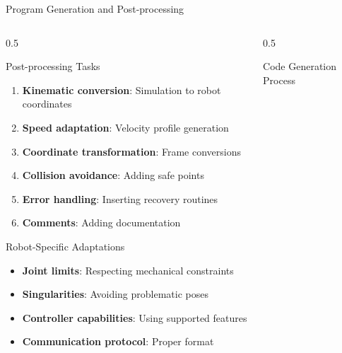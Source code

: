 \documentclass[10pt,aspectratio=169]{beamer}
\begin{document}
\begin{frame}{Program Generation and Post-processing}
\begin{columns}[T]
\begin{column}{0.5\textwidth}
\begin{block}{Post-processing Tasks}
\begin{enumerate}
\item \textbf{Kinematic conversion}: Simulation to robot coordinates
\item \textbf{Speed adaptation}: Velocity profile generation
\item \textbf{Coordinate transformation}: Frame conversions
\item \textbf{Collision avoidance}: Adding safe points
\item \textbf{Error handling}: Inserting recovery routines
\item \textbf{Comments}: Adding documentation
\end{enumerate}
\end{block}
\begin{alertblock}{Robot-Specific Adaptations}
\begin{itemize}
\item \textbf{Joint limits}: Respecting mechanical constraints
\item \textbf{Singularities}: Avoiding problematic poses
\item \textbf{Controller capabilities}: Using supported features
\item \textbf{Communication protocol}: Proper format
\end{itemize}
\end{alertblock}
\end{column}
\begin{column}{0.5\textwidth}
\begin{block}{Code Generation Process}
\end{block}
\end{column}
\end{columns}


\end{frame}
\end{document}
